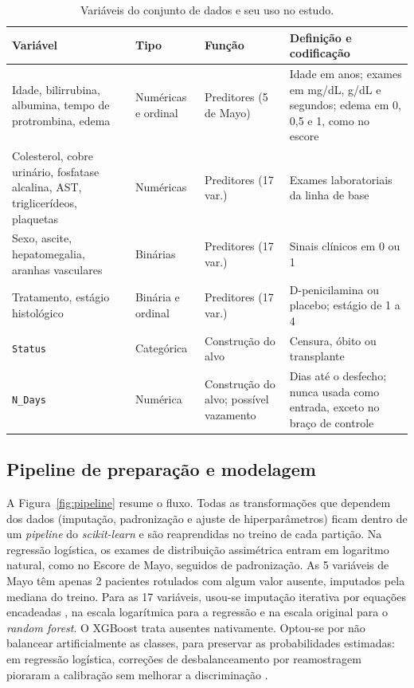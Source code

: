 \begin{table}[htbp]
\centering
\caption{Variáveis do conjunto de dados e seu uso no estudo.}
\label{tab:variaveis}
\small
\renewcommand{\arraystretch}{1.12}
\begin{tabularx}{\linewidth}{@{}p{3.6cm}p{2.0cm}p{2.3cm}X@{}}
\toprule
\textbf{Variável} & \textbf{Tipo} & \textbf{Função} & \textbf{Definição e codificação} \\
\midrule
Idade, bilirrubina, albumina, tempo de protrombina, edema & Numéricas e ordinal & Preditores (5 de Mayo) & Idade em anos; exames em mg/dL, g/dL e segundos; edema em 0, 0,5 e 1, como no escore \\
Colesterol, cobre urinário, fosfatase alcalina, AST, triglicerídeos, plaquetas & Numéricas & Preditores (17 var.) & Exames laboratoriais da linha de base \\
Sexo, ascite, hepatomegalia, aranhas vasculares & Binárias & Preditores (17 var.) & Sinais clínicos em 0 ou 1 \\
Tratamento, estágio histológico & Binária e ordinal & Preditores (17 var.) & D-penicilamina ou placebo; estágio de 1 a 4 \\
\texttt{Status} & Categórica & Construção do alvo & Censura, óbito ou transplante \\
\texttt{N\_Days} & Numérica & Construção do alvo; possível vazamento & Dias até o desfecho; nunca usada como entrada, exceto no braço de controle \\
\bottomrule
\end{tabularx}
\par{}
\end{table}

\subsection{Pipeline de preparação e modelagem}\label{subsec:pipeline}
A Figura~\ref{fig:pipeline} resume o fluxo. Todas as transformações que dependem dos dados (imputação, padronização e ajuste de hiperparâmetros) ficam dentro de um \textit{pipeline} do \textit{scikit-learn} \cite{pedregosa2011scikit} e são reaprendidas no treino de cada partição. Na regressão logística, os exames de distribuição assimétrica entram em logaritmo natural, como no Escore de Mayo, seguidos de padronização. As 5 variáveis de Mayo têm apenas 2 pacientes rotulados com algum valor ausente, imputados pela mediana do treino. Para as 17 variáveis, usou-se imputação iterativa por equações encadeadas \cite{vanbuuren2011mice}, na escala logarítmica para a regressão e na escala original para o \textit{random forest}. O XGBoost trata ausentes nativamente. Optou-se por não balancear artificialmente as classes, para preservar as probabilidades estimadas: em regressão logística, correções de desbalanceamento por reamostragem pioraram a calibração sem melhorar a discriminação \cite{vandengoorbergh2022harm}.


